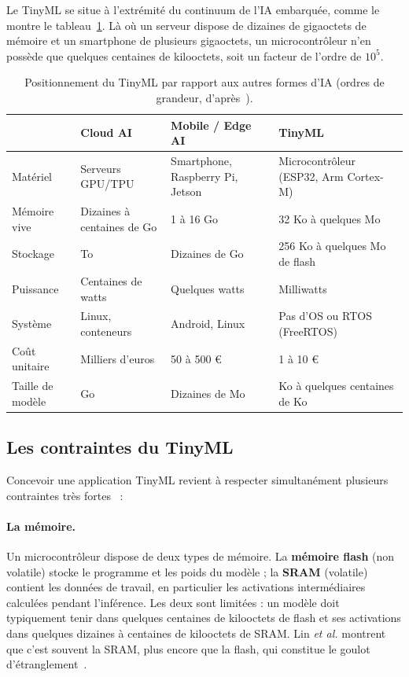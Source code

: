 Le TinyML se situe à l'extrémité du continuum de l'IA embarquée, comme le
montre le tableau~\ref{tab:spectre}. Là où un serveur dispose de dizaines de
gigaoctets de mémoire et un smartphone de plusieurs gigaoctets, un
microcontrôleur n'en possède que quelques centaines de kilooctets, soit un
facteur de l'ordre de $10^5$.

\begin{table}[H]
\centering
\small
\begin{tabularx}{\linewidth}{l X X X}
\toprule
 & \textbf{Cloud AI} & \textbf{Mobile / Edge AI} & \textbf{TinyML} \\
\midrule
Matériel        & Serveurs GPU/TPU & Smartphone, Raspberry Pi, Jetson & Microcontrôleur (ESP32, Arm Cortex-M) \\
Mémoire vive    & Dizaines à centaines de Go & 1 à 16 Go & 32 Ko à quelques Mo \\
Stockage        & To & Dizaines de Go & 256 Ko à quelques Mo de flash \\
Puissance       & Centaines de watts & Quelques watts & Milliwatts \\
Système         & Linux, conteneurs & Android, Linux & Pas d'OS ou RTOS (FreeRTOS) \\
Coût unitaire   & Milliers d'euros & 50 à 500 € & 1 à 10 € \\
Taille de modèle & Go & Dizaines de Mo & Ko à quelques centaines de Ko \\
\bottomrule
\end{tabularx}
\caption{Positionnement du TinyML par rapport aux autres formes d'IA (ordres de grandeur, d'après~\cite{banbury2020benchmarking,lin2020mcunet}).}
\label{tab:spectre}
\end{table}

\subsection{Les contraintes du TinyML}

Concevoir une application TinyML revient à respecter simultanément plusieurs
contraintes très fortes~\cite{banbury2020benchmarking,ray2022review} :

\paragraph{La mémoire.} Un microcontrôleur dispose de deux types de mémoire.
La \textbf{mémoire flash} (non volatile) stocke le programme et les poids du
modèle ; la \textbf{SRAM} (volatile) contient les données de travail, en
particulier les activations intermédiaires calculées pendant l'inférence. Les
deux sont limitées : un modèle doit typiquement tenir dans quelques centaines de
kilooctets de flash et ses activations dans quelques dizaines à centaines de
kilooctets de SRAM. Lin \emph{et al.} montrent que c'est souvent la SRAM, plus
encore que la flash, qui constitue le goulot d'étranglement~\cite{lin2020mcunet}.

